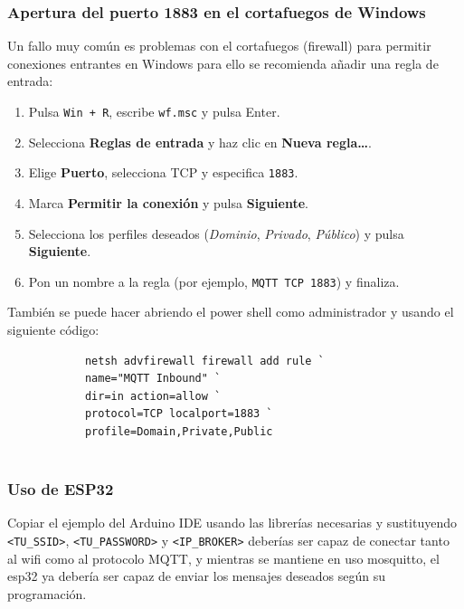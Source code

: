 \documentclass[12pt, a4paper]{article}
\begin{document}
\begin{umaappendices}
		\subsubsection{Apertura del puerto 1883 en el cortafuegos  de Windows}
		Un fallo muy común es problemas con el cortafuegos (firewall) para permitir conexiones entrantes en Windows para ello se recomienda añadir una regla de entrada:
		
		\begin{enumerate}
			\item Pulsa \texttt{Win + R}, escribe \texttt{wf.msc} y pulsa Enter.
			\item Selecciona \textbf{Reglas de entrada} y haz clic en \textbf{Nueva regla\ldots}.
			\item Elige \textbf{Puerto}, selecciona TCP y especifica \texttt{1883}.
			\item Marca \textbf{Permitir la conexión} y pulsa \textbf{Siguiente}.
			\item Selecciona los perfiles deseados (\emph{Dominio}, \emph{Privado}, \emph{Público}) y pulsa \textbf{Siguiente}.
			\item Pon un nombre a la regla (por ejemplo, \texttt{MQTT TCP 1883}) y finaliza.
		\end{enumerate}
		
		También se puede hacer abriendo el power shell como administrador y usando el siguiente código:
		
		\begin{verbatim}
			netsh advfirewall firewall add rule `
			name="MQTT Inbound" `
			dir=in action=allow `
			protocol=TCP localport=1883 `
			profile=Domain,Private,Public
		
		\end{verbatim}
		
		\subsubsection{Uso de ESP32}
		Copiar el ejemplo del Arduino IDE usando las librerías necesarias y sustituyendo \texttt{<TU\_SSID>}, \texttt{<TU\_PASSWORD>} y \texttt{<IP\_BROKER>} deberías ser capaz de conectar tanto al wifi como al protocolo MQTT, y mientras se mantiene en uso mosquitto, el esp32 ya debería ser capaz de enviar los mensajes deseados según su programación.
		
	
\end{umaappendices}
\end{document}
